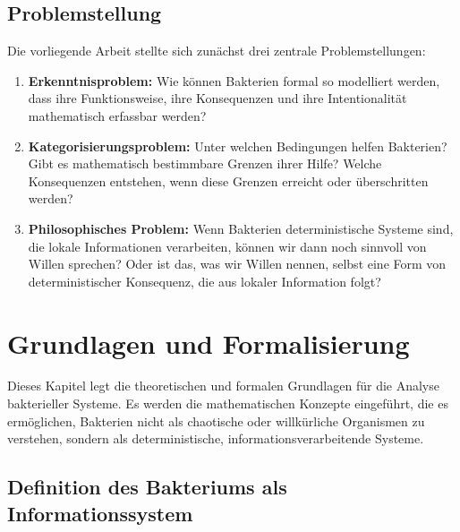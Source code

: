 \documentclass[a4paper,12pt]{article}
\theoremstyle{definition}
\begin{document}
\subsection{Problemstellung}

Die vorliegende Arbeit stellte sich zunächst drei zentrale Problemstellungen:

\begin{enumerate}
    \item \textbf{Erkenntnisproblem:} Wie können Bakterien formal so modelliert werden, dass ihre Funktionsweise, ihre Konsequenzen und ihre Intentionalität mathematisch erfassbar werden?
    
    \item \textbf{Kategorisierungsproblem:} Unter welchen Bedingungen helfen Bakterien? Gibt es mathematisch bestimmbare Grenzen ihrer Hilfe? Welche Konsequenzen entstehen, wenn diese Grenzen erreicht oder überschritten werden?
    
    \item \textbf{Philosophisches Problem:} Wenn Bakterien deterministische Systeme sind, die lokale Informationen verarbeiten, können wir dann noch sinnvoll von Willen sprechen? Oder ist das, was wir Willen nennen, selbst eine Form von deterministischer Konsequenz, die aus lokaler Information folgt?
\end{enumerate}

\section{Grundlagen und Formalisierung}

Dieses Kapitel legt die theoretischen und formalen Grundlagen für die Analyse bakterieller Systeme. Es werden die mathematischen Konzepte eingeführt, die es ermöglichen, Bakterien nicht als chaotische oder willkürliche Organismen zu verstehen, sondern als deterministische, informationsverarbeitende Systeme.

\subsection{Definition des Bakteriums als Informationssystem}
\end{document}
